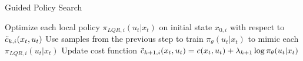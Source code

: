 \begin{algorithm}[t!]
\caption{Guided Policy Search}
\begin{algorithmic}[1]
\label{alg:guided}
\STATE Optimize each local policy $\pi_{LQR,i}(u_t|x_t)$ on initial state $x_{0,i}$ with respect to $\Tilde{c}_{k,i}(x_t,u_t)$
\STATE Use samples from the previous step to train $\pi_\theta(u_t|x_t)$ to mimic each $\pi_{LQR,i}(u_t|x_t)$
\STATE Update cost function $\Tilde{c}_{k+1,i}(x_t,u_t) = c(x_t,u_t) + \lambda_{k+1}\log \pi_\theta(u_t|x_t)$
\ENDWHILE
\end{algorithmic}
\end{algorithm}